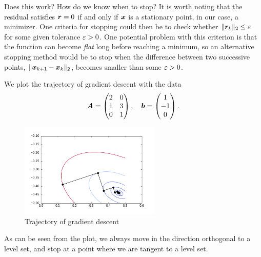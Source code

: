 Does this work? How do we know when to stop? It is worth noting that the residual satisfies $\bm{r}=0$ if and only if $\bm{x}$ is a stationary point, in our case, a minimizer. One criteria for stopping could then be to check whether $\Vert {\bm{r}_k}\Vert_2\leq \varepsilon$ for some given tolerance $\varepsilon>0$. One potential problem with this criterion is that the function can become {\em flat} long before reaching a minimum, so an alternative stopping method would be to stop when the difference between two successive points, $\Vert {\bm{x}_{k+1}-\bm{x}_k}\Vert_2$, becomes smaller than some $\varepsilon>0$.

\begin{example}
We plot the trajectory of gradient descent with the data
\begin{equation*}
\bm{A} = \begin{pmatrix}
2 & 0\\
1 & 3\\
0 & 1
\end{pmatrix}, \quad
\bm{b} = \begin{pmatrix}
1\\ -1\\ 0
\end{pmatrix}.
\end{equation*}

\begin{figure}[h!]
\centering
\includegraphics[width=0.6\textwidth]{images/graddescent.png}
\caption{Trajectory of gradient descent}
\end{figure}
As can be seen from the plot, we always move in the direction orthogonal to a level set, and stop at a point where we are tangent to a level set.
\end{example}



